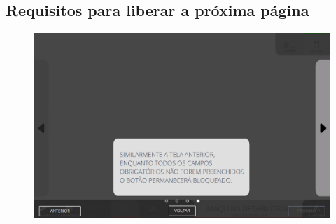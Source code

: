 \newpage
\thispagestyle{fancy}
\vspace*{40 pt}
\subsection{\small Requisitos para liberar a próxima página}
\vspace*{\fill}
\begin{figure}[h]
    \centering
    \includegraphics[width=576 px,height=360 px]{src/imagesICV/09-request/new/e-9.png}
\end{figure}
\vspace*{\fill}

